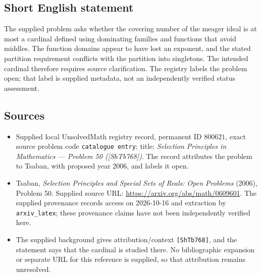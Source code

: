 \documentclass[11pt]{article}
\begin{document}
\subsection{Short English statement}
The supplied problem asks whether the covering number of the meager ideal is at most a cardinal defined using dominating families and functions that avoid middles. The function domains appear to have lost an exponent, and the stated partition requirement conflicts with the partition into singletons. The intended cardinal therefore requires source clarification. The registry labels the problem open; that label is supplied metadata, not an independently verified status assessment.
\subsection{Sources}
\begin{itemize}
\item Supplied local UnsolvedMath registry record, permanent ID \(800621\), exact source problem code \texttt{catalogue entry}; title: \emph{Selection Principles in Mathematics --- Problem 50 ([ShTb768])}. The record attributes the problem to Tsaban, with proposed year 2006, and labels it open.
\item Tsaban, \emph{Selection Principles and Special Sets of Reals: Open Problems} (2006), Problem 50. Supplied source URL: \url{https://arxiv.org/abs/math/0609601}. The supplied provenance records access on 2026-10-16 and extraction by \texttt{arxiv\_latex}; these provenance claims have not been independently verified here.
\item The supplied background gives attribution/context \texttt{[ShTb768]}, and the statement says that the cardinal is studied there. No bibliographic expansion or separate URL for this reference is supplied, so that attribution remains unresolved.
\end{itemize}
\end{document}
